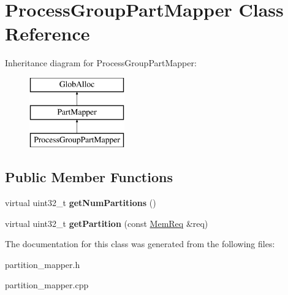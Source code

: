 \hypertarget{classProcessGroupPartMapper}{\section{Process\-Group\-Part\-Mapper Class Reference}
\label{classProcessGroupPartMapper}
}
Inheritance diagram for Process\-Group\-Part\-Mapper\-:\begin{figure}[H]
\begin{center}
\leavevmode
\includegraphics[height=3.000000cm]{classProcessGroupPartMapper}
\end{center}
\end{figure}
\subsection*{Public Member Functions}
\begin{DoxyCompactItemize}
\item 
\hypertarget{classProcessGroupPartMapper_afe8adc1616fa3939456508275362fcb9}{virtual uint32\-\_\-t {\bfseries get\-Num\-Partitions} ()}\label{classProcessGroupPartMapper_afe8adc1616fa3939456508275362fcb9}

\item 
\hypertarget{classProcessGroupPartMapper_ac47505fac59c0e063545d52bf35b1b06}{virtual uint32\-\_\-t {\bfseries get\-Partition} (const \hyperlink{structMemReq}{Mem\-Req} \&req)}\label{classProcessGroupPartMapper_ac47505fac59c0e063545d52bf35b1b06}

\end{DoxyCompactItemize}


The documentation for this class was generated from the following files\-:\begin{DoxyCompactItemize}
\item 
partition\-\_\-mapper.\-h\item 
partition\-\_\-mapper.\-cpp\end{DoxyCompactItemize}
